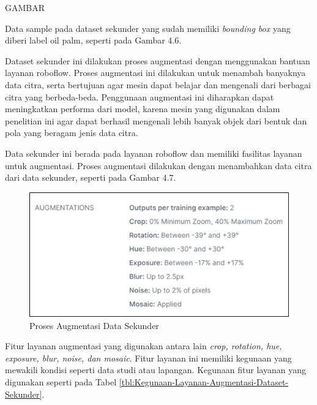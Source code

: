 GAMBAR

Data sample pada dataset sekunder yang sudah memiliki \textit{bounding box} yang diberi label oil palm, seperti pada Gambar 4.6.

Dataset sekunder ini dilakukan proses augmentasi dengan menggunakan bantuan layanan roboflow. Proses augmentasi ini dilakukan untuk menambah banyaknya data citra, serta bertujuan agar mesin dapat belajar dan mengenali dari berbagai citra yang berbeda-beda. Penggunaan augmentasi ini diharapkan dapat meningkatkan performa dari model, karena mesin yang digunakan dalam penelitian ini agar dapat berhasil mengenali lebih banyak objek dari bentuk dan pola yang beragam jenis data citra. 

Data sekunder ini berada pada layanan roboflow dan memiliki fasilitas layanan untuk augmentasi. Proses augmentasi dilakukan dengan menambahkan data citra dari data sekunder, seperti pada Gambar 4.7.

\begin{figure}[H]
	\vspace{-0.1cm}
	\begin{center}
		\includegraphics[width=1\columnwidth]{bab4/Gambar/Picture7.png}
	\end{center}
	\vspace{-0.2cm}
	\captionsetup{justification=centering}
	\caption{Proses Augmentasi Data Sekunder }\label{img:Proses-Augmentasi-Data-Sekunder}
\end{figure}

Fitur layanan augmentasi yang digunakan antara lain \textit{crop, rotation, hue, exposure, blur, noise, dan mosaic}. Fitur layanan ini memiliki kegunaan yang mewakili kondisi seperti data studi atau lapangan. Kegunaan fitur layanan yang digunakan seperti pada Tabel \ref{tbl:Kegunaan-Layanan-Augmentasi-Dataset-Sekunder}.
	
